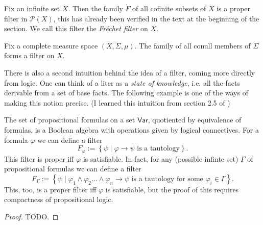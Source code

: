 \begin{example}
    Fix an infinite set \( X \). Then the family \( \acute F \) of all cofinite subsets of \( X \) is a proper filter in \( \mathcal{P}(X) \), this has already been verified in the text at the beginning of the section. We call this filter the \emph{Fréchet filter} on \( X \).
\end{example}

\begin{example}
    Fix a complete measure space \( (X, \Sigma, \mu) \). The family of all conull members of \( \Sigma \) forms a filter on \( X \).
\end{example}

There is also a second intuition behind the idea of a filter, coming more directly from logic. One can think of a liter as a \emph{state of knowledge}, i.e. all the facts derivable from a set of base facts. The following example is one of the ways of making this notion precise. (I learned this intuition from section 2.5 of \cite{SU06})

\begin{example}
    The set of propositional formulas on a set \( \mathsf{Var} \), quotiented by equivalence of formulas, is a Boolean algebra with operations given by logical connectives. For a formula \( \varphi \) we can define a filter
    \[ 
        F_\varphi := \left\{ \psi \mid \varphi \to \psi \text{ is a tautology} \right\}. 
   \]
   This filter is proper iff \( \varphi \) is satisfiable. In fact, for any (possible infinte set) \( \Gamma \) of propositional formulas we can define a filter
   \[ 
       F_\Gamma := \left\{ \psi \mid \varphi_1 \wedge \varphi_2 \ldots \wedge \varphi_n \to \psi \text{ is a tautology for some } \varphi_i \in \Gamma \right\}. 
  \]
  This, too, is a proper filter iff \( \varphi \) is satisfiable, but the proof of this requires compactness of propositional logic.
\end{example}



\begin{proof}
TODO.
\end{proof}

